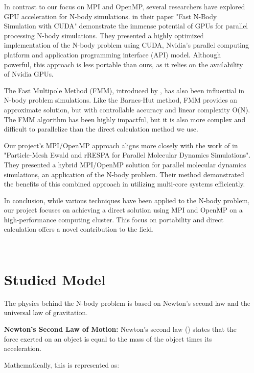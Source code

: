 \documentclass{solutionclass} %
\begin{document}
In contrast to our focus on MPI and OpenMP, several researchers have explored GPU acceleration for N-body simulations. \textbf{\textcite{nyland2007fast}} in their paper "Fast N-Body Simulation with CUDA" demonstrate the immense potential of GPUs for parallel processing N-body simulations. They presented a highly optimized implementation of the N-body problem using CUDA, Nvidia's parallel computing platform and application programming interface (API) model. Although powerful, this approach is less portable than ours, as it relies on the availability of Nvidia GPUs.

The Fast Multipole Method (FMM), introduced by \textbf{\textcite{greengard1987fast}}, has also been influential in N-body problem simulations. Like the Barnes-Hut method, FMM provides an approximate solution, but with controllable accuracy and linear complexity O(N). The FMM algorithm has been highly impactful, but it is also more complex and difficult to parallelize than the direct calculation method we use.

Our project's MPI/OpenMP approach aligns more closely with the work of \textbf{\textcite{plimpton1997particle}} in "Particle-Mesh Ewald and rRESPA for Parallel Molecular Dynamics Simulations". They presented a hybrid MPI/OpenMP solution for parallel molecular dynamics simulations, an application of the N-body problem. Their method demonstrated the benefits of this combined approach in utilizing multi-core systems efficiently.

In conclusion, while various techniques have been applied to the N-body problem, our project focuses on achieving a direct solution using MPI and OpenMP on a high-performance computing cluster. This focus on portability and direct calculation offers a novel contribution to the field.

\divider
\\
\section{Studied Model}

The physics behind the N-body problem is based on Newton's second law and the universal law of gravitation.

\textbf{Newton's Second Law of Motion:}
Newton's second law (\textbf{\textcite{newton1687mathematical}}) states that the force exerted on an object is equal to the mass of the object times its acceleration.

Mathematically, this is represented as:
\end{document}
